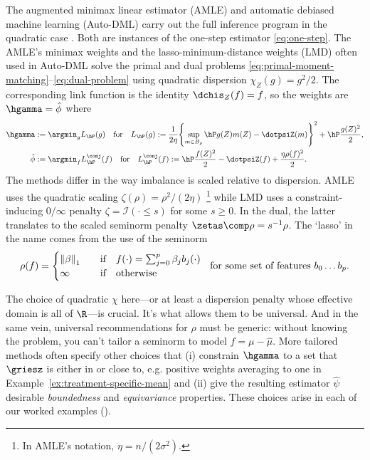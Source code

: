 \documentclass{article}
\begin{document}
The augmented minimax linear estimator (AMLE) and automatic debiased machine learning (Auto-DML) carry out the full inference program in the quadratic case \citep{hirshberg2018augmented,chernozhukov2022automatic}. Both are instances of the one-step estimator \eqref{eq:one-step}. The AMLE's minimax weights and the lasso-minimum-distance weights (LMD) \citep{chernozhukov2022locally} often used in Auto-DML solve the primal and dual problems \eqref{eq:primal-moment-matching}--\eqref{eq:dual-problem} using quadratic dispersion $\chi_Z(g) = g^2/2$. The corresponding link function is the identity $\dchis_Z(f)=f$, so the weights are $\hgamma=\hat\phi$ where
\begin{equation}
\begin{aligned}
\hgamma &:= \argmin_g L_{\hP}(g) \qfor L_{\hP}(g) := \frac{1}{2\eta} \qty{\sup_{m \in B_\rho} \hP g(Z) m(Z) - \dotpsiZ(m)}^2 + \hP \frac{g(Z)^2}{2}, \\
\hat\phi &:= \argmin_f L^\conj_{\hP}(f) \qfor L^\conj_{\hP}(f) := \hP \frac{f(Z)^2}{2} - \dotpsiZ(f) + \frac{\eta \rho(f)^2}{2}.
\end{aligned}
\end{equation}
The methods differ in the way imbalance
is scaled relative to dispersion.
AMLE uses the quadratic scaling $\zeta(\rho)=\rho^2/(2\eta)$%
\footnote{In AMLE's notation, $\eta = n/(2\sigma^2)$.} while LMD uses a constraint-inducing $0/\infty$ penalty $\zeta = \mathcal{I}(\cdot \le s)$ for some $s \ge 0$. In the dual, the latter translates to the scaled seminorm penalty $\zetas \comp \rho = s^{-1}\rho$. The `lasso' in the name comes from the use of the seminorm
\begin{equation}
\label{eq:lasso-seminorm}
\rho(f) =
\begin{cases}
  \norm{\beta}_1 &\qif f(\cdot)=\sum_{j=0}^p \beta_j b_j(\cdot) \\
  \infty         &\qif \text{otherwise}
\end{cases}
\ \text{ for some set of features } b_0 \ldots b_p.
\end{equation}

The choice of quadratic $\chi$ here---or at least a dispersion penalty whose effective domain is all of $\R$---is crucial. It's  what allows them to be universal. And in the same vein, universal recommendations for $\rho$ must be generic: without knowing the problem, you can't tailor a seminorm to model $f=\mu-\hat\mu$. More tailored methods often specify other choices
that (i) constrain $\hgamma$ to a set
that $\griesz$ is either in or close to, e.g. positive weights averaging to one in Example~\ref{ex:treatment-specific-mean}
and (ii) give the resulting estimator $\hat\psi$ desirable \emph{boundedness} and \emph{equivariance} properties. These choices arise in each of our worked examples ().
\end{document}
